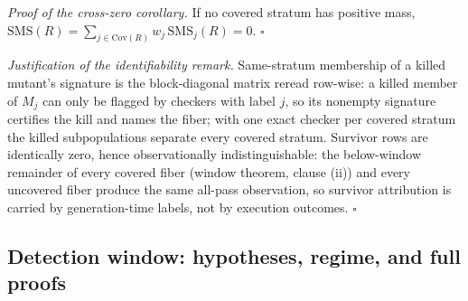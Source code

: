 \documentclass[review,12pt,authoryear]{elsarticle}
\newcounter{none}                   %
\begin{document}
\emph{Proof of the cross-zero corollary.} If no covered stratum has
positive mass,
$\mathrm{SMS}(R) = \sum_{j \in \mathrm{Cov}(R)} w_j\,\mathrm{SMS}_j(R) = 0$.
$\square$

\emph{Justification of the identifiability remark.} Same-stratum
membership of a killed mutant's signature is the block-diagonal matrix
reread row-wise: a killed member of $M_j$ can only be flagged by
checkers with label $j$, so its nonempty signature certifies the kill
and names the fiber; with one exact checker per covered stratum the
killed subpopulations separate every covered stratum. Survivor rows are
identically zero, hence observationally indistinguishable: the
below-window remainder of every covered fiber (window theorem, clause
(ii)) and every uncovered fiber produce the same all-pass observation,
so survivor attribution is carried by generation-time labels, not by
execution outcomes. $\square$

\subsection{Detection window: hypotheses, regime, and full proofs}\label{g.8-window-proofs}
\end{document}
